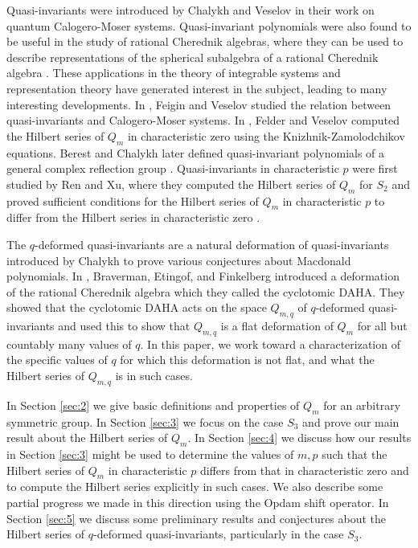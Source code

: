 \documentclass[11pt]{article}
\theoremstyle{definition}
\begin{document}
Quasi-invariants were introduced by Chalykh and Veselov \cite{cmp/1104179957} in their work on quantum Calogero-Moser systems. Quasi-invariant polynomials were also found to be useful in the study of rational Cherednik algebras, where they can be used to describe representations of the spherical subalgebra of a rational Cherednik algebra \cite{berest2003cherednik}. These applications in the theory of integrable systems and representation theory have generated interest in the subject, leading to many interesting developments. In \cite{feigin}, Feigin and Veselov studied the relation between quasi-invariants and Calogero-Moser systems. In \cite{felder2003action}, Felder and Veselov computed the Hilbert series of $Q_m$ in characteristic zero using the Knizhnik-Zamolodchikov equations. Berest and Chalykh later defined quasi-invariant polynomials of a general complex reflection group \cite{berest_chalykh_2011}. Quasi-invariants in characteristic $p$ were first studied by Ren and Xu, where they computed the Hilbert series of $Q_m$ for $S_2$ and proved sufficient conditions for the Hilbert series of $Q_m$ in characteristic $p$ to differ from the Hilbert series in characteristic zero \cite{Ren_2020}.

The $q$-deformed quasi-invariants are a natural deformation of quasi-invariants introduced by Chalykh \cite{Chalykh2002MacdonaldPA} to prove various conjectures about Macdonald polynomials. In \cite{BEF}, Braverman, Etingof, and Finkelberg introduced a deformation of the rational Cherednik algebra which they called the cyclotomic DAHA. They showed that the cyclotomic DAHA acts on the space $Q_{m,q}$ of $q$-deformed quasi-invariants and used this to show that $Q_{m,q}$ is a flat deformation of $Q_m$ for all but countably many values of $q$. In this paper, we work toward a characterization of the specific values of $q$ for which this deformation is not flat, and what the Hilbert series of $Q_{m,q}$ is in such cases.

In Section \ref{sec:2} we give basic definitions and properties of $Q_m$ for an arbitrary symmetric group. In Section \ref{sec:3} we focus on the case $S_3$ and prove our main result about the Hilbert series of $Q_m$. In Section \ref{sec:4} we discuss how our results in Section \ref{sec:3} might be used to determine the values of $m,p$ such that the Hilbert series of $Q_m$ in characteristic $p$ differs from that in characteristic zero and to compute the Hilbert series explicitly in such cases. We also describe some partial progress we made in this direction using the Opdam shift operator. In Section \ref{sec:5} we discuss some preliminary results and conjectures about the Hilbert series of $q$-deformed quasi-invariants, particularly in the case $S_3$.
\end{document}
